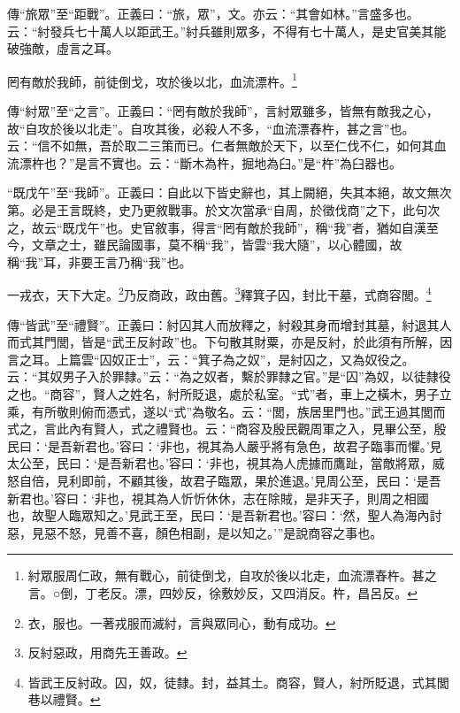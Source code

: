 {\noindent\zhuan{}\fzbyks 傳“旅眾”至“距戰”。正義曰：“旅，眾”，文。亦云：“其會如林。”言盛多也。云：“紂發兵七十萬人以距武王。”紂兵雖則眾多，不得有七十萬人，是史官美其能破強敵，虛言之耳。 \par}

罔有敵於我師，前徒倒戈，攻於後以北，血流漂杵。\footnote{紂眾服周仁政，無有戰心，前徒倒戈，自攻於後以北走，血流漂舂杵。甚之言。○倒，丁老反。漂，四妙反，徐敷妙反，又四消反。杵，昌呂反。}

{\noindent\zhuan{}\fzbyks 傳“紂眾”至“之言”。正義曰：“罔有敵於我師”，言紂眾雖多，皆無有敵我之心，故“自攻於後以北走”。自攻其後，必殺人不多，“血流漂舂杵，甚之言”也。云：“信不如無，吾於取二三策而已。仁者無敵於天下，以至仁伐不仁，如何其血流漂杵也？”是言不實也。云：“斷木為杵，掘地為臼。”是“杵”為臼器也。 \par}

{\noindent\shu{}\fzkt “既戊午”至“我師”。正義曰：自此以下皆史辭也，其上闕絕，失其本絕，故文無次第。必是王言既終，史乃更敘戰事。於文次當承“自周，於徵伐商”之下，此句次之，故云“既戊午”也。史官敘事，得言“罔有敵於我師”，稱“我”者，猶如自漢至今，文章之士，雖民論國事，莫不稱“我”，皆雲“我大隨”，以心體國，故稱“我”耳，非要王言乃稱“我”也。 \par}

一戎衣，天下大定。\footnote{衣，服也。一著戎服而滅紂，言與眾同心，動有成功。}乃反商政，政由舊。\footnote{反紂惡政，用商先王善政。}釋箕子囚，封比干墓，式商容閭。\footnote{皆武王反紂政。囚，奴，徒隸。封，益其土。商容，賢人，紂所貶退，式其閭巷以禮賢。}

{\noindent\zhuan{}\fzbyks 傳“皆武”至“禮賢”。正義曰：紂囚其人而放釋之，紂殺其身而增封其墓，紂退其人而式其門閭，皆是“武王反紂政”也。下句散其財粟，亦是反紂，於此須有所解，因言之耳。上篇雲“囚奴正士”，云：“箕子為之奴”，是紂囚之，又為奴役之。云：“其奴男子入於罪隸。”云：“為之奴者，繫於罪隸之官。”是“囚”為奴，以徒隸役之也。“商容”，賢人之姓名，紂所貶退，處於私室。“式”者，車上之橫木，男子立乘，有所敬則俯而憑式，遂以“式”為敬名。云：“閭，族居里門也。”武王過其閭而式之，言此內有賢人，式之禮賢也。云：“商容及殷民觀周軍之入，見畢公至，殷民曰：‘是吾新君也。’容曰：‘非也，視其為人嚴乎將有急色，故君子臨事而懼。’見太公至，民曰：‘是吾新君也。’容曰：‘非也，視其為人虎據而鷹趾，當敵將眾，威怒自倍，見利即前，不顧其後，故君子臨眾，果於進退。’見周公至，民曰：‘是吾新君也。’容曰：‘非也，視其為人忻忻休休，志在除賊，是非天子，則周之相國也，故聖人臨眾知之。’見武王至，民曰：‘是吾新君也。’容曰：‘然，聖人為海內討惡，見惡不怒，見善不喜，顏色相副，是以知之。’”是說商容之事也。 \par}

